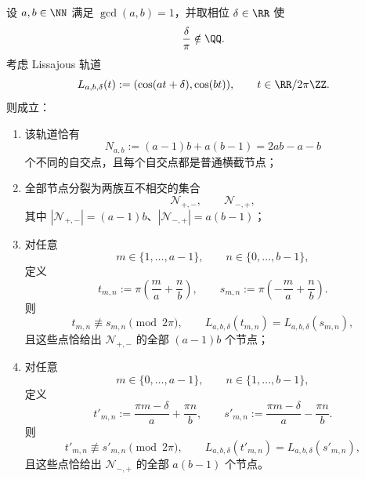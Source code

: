 \begin{theorem}\label{thm:cdim-nonresonant-lissajous-node-count}
设 \(a,b\in\NN\) 满足 \(\gcd(a,b)=1\)，并取相位 \(\delta\in\RR\) 使
\[
\frac{\delta}{\pi}\notin\QQ.
\]
考虑 Lissajous 轨道
\[
L_{a,b,\delta}(t):=(\cos(at+\delta),\cos(bt)),
\qquad
t\in\RR/2\pi\ZZ.
\]
则成立：
\begin{enumerate}
  \item 该轨道恰有
  \[
  N_{a,b}:=(a-1)b+a(b-1)=2ab-a-b
  \]
  个不同的自交点，且每个自交点都是普通横截节点；
  \item 全部节点分裂为两族互不相交的集合
  \[
  \mathcal N_{+,-},
  \qquad
  \mathcal N_{-,+},
  \]
  其中 \(|\mathcal N_{+,-}|=(a-1)b\)、\(|\mathcal N_{-,+}|=a(b-1)\)；
  \item 对任意
  \[
  m\in\{1,\dots,a-1\},
  \qquad
  n\in\{0,\dots,b-1\},
  \]
  定义
  \[
  t_{m,n}:=\pi\left(\frac{m}{a}+\frac{n}{b}\right),
  \qquad
  s_{m,n}:=\pi\left(-\frac{m}{a}+\frac{n}{b}\right).
  \]
  则
  \[
  t_{m,n}\not\equiv s_{m,n}\pmod{2\pi},
  \qquad
  L_{a,b,\delta}(t_{m,n})=L_{a,b,\delta}(s_{m,n}),
  \]
  且这些点恰给出 \(\mathcal N_{+,-}\) 的全部 \((a-1)b\) 个节点；
  \item 对任意
  \[
  m\in\{0,\dots,a-1\},
  \qquad
  n\in\{1,\dots,b-1\},
  \]
  定义
  \[
  t'_{m,n}:=\frac{\pi m-\delta}{a}+\frac{\pi n}{b},
  \qquad
  s'_{m,n}:=\frac{\pi m-\delta}{a}-\frac{\pi n}{b}.
  \]
  则
  \[
  t'_{m,n}\not\equiv s'_{m,n}\pmod{2\pi},
  \qquad
  L_{a,b,\delta}(t'_{m,n})=L_{a,b,\delta}(s'_{m,n}),
  \]
  且这些点恰给出 \(\mathcal N_{-,+}\) 的全部 \(a(b-1)\) 个节点。
\end{enumerate}
\end{theorem}

